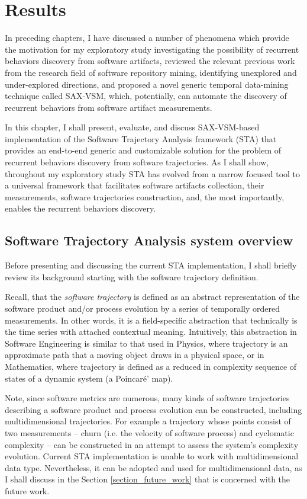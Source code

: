 \chapter{Results}\label{chapter_sta}
In preceding chapters, I have discussed a number of phenomena which provide the motivation for my exploratory study investigating the possibility of recurrent behaviors discovery from software artifacts, reviewed the relevant previous work from the research field of software repository mining, identifying unexplored and under-explored directions, and proposed a novel generic temporal data-mining technique called \mbox{SAX-VSM}, which, potentially, can automate the discovery of recurrent behaviors from software artifact measurements.

In this chapter, I shall present, evaluate, and discuss \mbox{SAX-VSM}-based implementation of the Software Trajectory Analysis framework (STA) that provides an end-to-end generic and customizable solution for the problem of recurrent behaviors discovery from software trajectories.  As I shall show, throughout my exploratory study STA has evolved from a narrow focused tool to a universal framework that facilitates software artifacts collection, their measurements, software trajectories construction, and, the most importantly, enables the recurrent behaviors discovery.

\section{Software Trajectory Analysis system overview}\label{section_sta_overview}
Before presenting and discussing the current STA implementation, I shall briefly review its background starting with the software trajectory definition. 

Recall, that the \textit{software trajectory} is defined as an abstract representation of the software product and/or process evolution by a series of temporally ordered measurements. In other words, it is a field-specific abstraction that technically is the time series with attached contextual meaning. Intuitively, this abstraction in Software Engineering is similar to that used in Physics, where trajectory is an approximate path that a moving object draws in a physical space, or in Mathematics, where trajectory is defined as a reduced in complexity sequence of states of a dynamic system (a Poincar\'{e}' map).

Note, since software metrics are numerous, many kinds of software trajectories describing a software product and process evolution can be constructed, including multidimensional trajectories. For example a trajectory whose points consist of two measurements -- churn (i.e. the velocity of software process) and cyclomatic complexity -- can be constructed in an attempt to assess the system's complexity evolution. Current STA implementation is unable to work with multidimensional data type. Nevertheless, it can be adopted and used for multidimensional data, as I shall discuss in the Section \ref{section_future_work} that is concerned with the future work.

